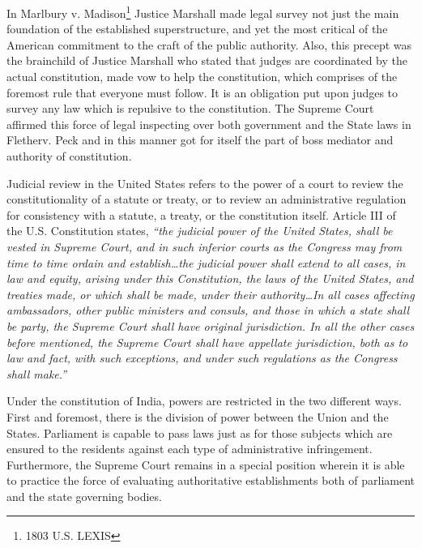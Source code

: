 \begin{multicols}{2}
\vspace{-.1cm}

\noi
In Marlbury v. Madison\footnote{1803 U.S. LEXIS} Justice Marshall made legal survey not just the main foundation of the established superstructure, and yet the most critical of the American commitment to the
craft of the public authority. Also, this precept was the brainchild of Justice Marshall who
stated that judges are coordinated by the actual constitution, made vow to help the
constitution, which comprises of the foremost rule that everyone must follow. It is an
obligation put upon judges to survey any law which is repulsive to the constitution. The
Supreme Court affirmed this force of legal inspecting over both government and the State
laws in Fletherv. Peck and in this manner got for itself the part of boss mediator and authority
of constitution.

\vspace{-.15cm}

\noi
Judicial review in the United States refers to the power of a court to review the
constitutionality of a statute or treaty, or to review an administrative regulation for
consistency with a statute, a treaty, or the constitution itself. Article III of the U.S.
Constitution states, \textit{“the judicial power of the United States, shall be vested in Supreme
Court, and in such inferior courts as the Congress may from time to time ordain and
establish…the judicial power shall extend to all cases, in law and equity, arising under this
Constitution, the laws of the United States, and treaties made, or which shall be made, under
their authority…In all cases affecting ambassadors, other public ministers and consuls, and
those in which a state shall be party, the Supreme Court shall have original jurisdiction. In
all the other cases before mentioned, the Supreme Court shall have appellate jurisdiction,
both as to law and fact, with such exceptions, and under such regulations as the Congress
shall make.”}

\vspace{-.15cm}


\vspace{-.15cm}

\noi
Under the constitution of India, powers are restricted in the two different ways. First and
foremost, there is the division of power between the Union and the States. Parliament is
capable to pass laws just as for those subjects which are ensured to the residents against each
type of administrative infringement. Furthermore, the Supreme Court remains in a special
position wherein it is able to practice the force of evaluating authoritative establishments both
of parliament and the state governing bodies.


\end{multicols}

